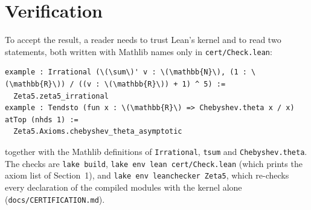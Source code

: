 \documentclass[11pt]{article}
\newcommand{\lean}[1]{\texttt{#1}}
\begin{document}
\section{Verification}

To accept the result, a reader needs to trust Lean's kernel and to read two statements, both
written with Mathlib names only in \lean{cert/Check.lean}:
\begin{Verbatim}[fontsize=\small,frame=single,commandchars=\\\{\}]
example : Irrational (\(\sum\)' v : \(\mathbb{N}\), (1 : \(\mathbb{R}\)) / ((v : \(\mathbb{R}\)) + 1) ^ 5) :=
  Zeta5.zeta5_irrational
example : Tendsto (fun x : \(\mathbb{R}\) => Chebyshev.theta x / x) atTop (nhds 1) :=
  Zeta5.Axioms.chebyshev_theta_asymptotic
\end{Verbatim}
\noindent together with the Mathlib definitions of \lean{Irrational}, \lean{tsum} and
\lean{Chebyshev.theta}. The checks are \lean{lake build}, \lean{lake env lean cert/Check.lean}
(which prints the axiom list of Section~1), and \lean{lake env leanchecker Zeta5}, which
re-checks every declaration of the compiled modules with the kernel alone
(\lean{docs/CERTIFICATION.md}).
\end{document}
